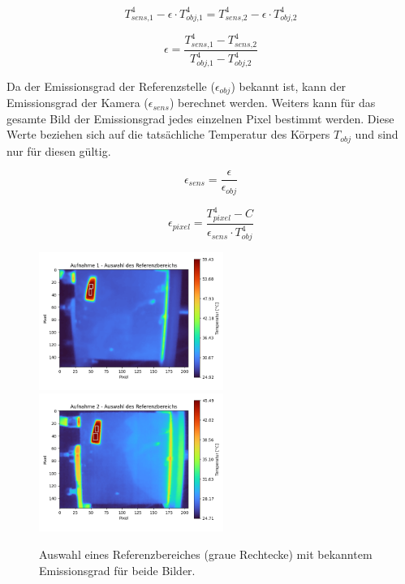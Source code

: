 \documentclass[10pt,a4paper,german]{article}
\begin{document}
\begin{equation}
    T_\textit{sens,1}^4 - \epsilon \cdot T_\textit{obj,1}^4 = T_\textit{sens,2}^4 - \epsilon \cdot T_\textit{obj,2}^4 
\end{equation}

\begin{equation}
    \epsilon = \frac{T_\textit{sens,1}^4 - T_\textit{sens,2}^4}{T_\textit{obj,1}^4 - T_\textit{obj,2}^4}
\end{equation}

Da der Emissionsgrad der Referenzstelle ($\epsilon_\textit{obj}$) bekannt ist, kann der Emissionsgrad der Kamera ($\epsilon_\textit{sens}$) berechnet werden.
Weiters kann für das gesamte Bild der Emissionsgrad jedes einzelnen Pixel bestimmt werden.
Diese Werte beziehen sich auf die tatsächliche Temperatur des Körpers $T_\textit{obj}$ und sind nur für diesen gültig.

\begin{equation}
    \epsilon_\textit{sens} = \frac{\epsilon}{\epsilon_\textit{obj}}
\end{equation}

\begin{equation}
    \epsilon_\textit{pixel} = \frac{T_\textit{pixel}^4 - C}{\epsilon_\textit{sens} \cdot T_\textit{obj}^4}
\end{equation}

\begin{figure}[H]
    \centering
    \captionsetup{width=12cm}
    \includegraphics[width=6cm]{img/ref_sel_1.png}
    \includegraphics[width=6cm]{img/ref_sel_2.png}
    \caption{Auswahl eines Referenzbereiches (graue Rechtecke) mit bekanntem Emissionsgrad für beide Bilder.}
\end{figure}
\end{document}
